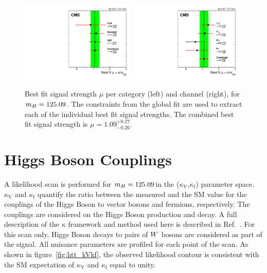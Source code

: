 \begin{figure}[!ht]
  \centering
    \includegraphics[width=0.49\textwidth]{higgs_to_taus/plots/Figure_021-a.pdf}
    \includegraphics[width=0.49\textwidth]{higgs_to_taus/plots/Figure_021-b.pdf}
   \caption{Best fit signal strength $\mu$ per category (left) and channel (right), for $m_{H} = 125.09$\GeV. 
The constraints from the global fit are used to extract each of the individual best fit signal strengths. 
The combined best fit signal strength is $\mu = 1.09 ^{+0.27} _{-0.26}$.}
\label{fig:htt_muvalue}
\end{figure}


\section{Higgs Boson Couplings}
\label{sec:htt_kFkV}
A likelihood scan is performed for $m_{H}=125.09$\GeV in the ($\kappa_\mathrm{V}$,$\kappa_\mathrm{f}$) parameter 
space. $\kappa_\mathrm{V}$ and $\kappa_\mathrm{f}$ quantify the ratio between the measured 
and the SM value for the couplings of the Higgs Boson to vector bosons and fermions, respectively. 
The couplings are considered on the Higgs Boson production and decay.
A full description of the $\kappa$ framework and method used here is described 
in Ref.~\cite{Chatrchyan:2014nva}. For this scan only, Higgs Boson decays to pairs of $W$ bosons are 
considered as part of the signal. All nuisance parameters are profiled for each point of the scan. As shown in 
figure~\ref{fig:htt_kVkf}, the observed likelihood contour is consistent with the SM expectation of $\kappa_\mathrm{V}$ 
and $\kappa_\mathrm{f}$ equal to unity.


